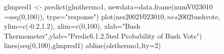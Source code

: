 \begin{Schunk}
\begin{Sinput}
 glmpred1 <- predict(glmthermo1, newdata=data.frame(numV023010 =seq(0,100)), type="response")
 plot(nes2002$V023010, nes2002$bushvote, ylim=c(-0.2,1.2), xlim=c(0,100), xlab="Bush Thermometer",ylab="Predic6.1.2.5ted Probability of Bush Vote")
 lines(seq(0,100),glmpred1)
 abline(olsthermo1,lty=2)
\end{Sinput}
\end{Schunk}
